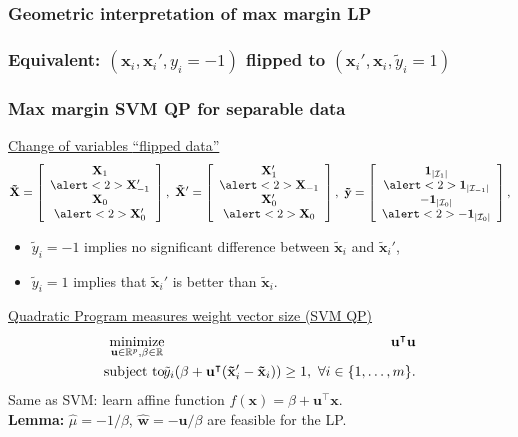\documentclass{beamer}
\DeclareMathOperator*{\minimize}{minimize}
\newcommand{\RR}{\mathbb R}
\begin{document}
\begin{frame}
  \frametitle{Geometric interpretation of max margin LP}
  
\end{frame}

\begin{frame}
  \frametitle{Equivalent: $(\mathbf x_i, \mathbf x_i', y_i=-1)$ flipped to $(\mathbf x_i', \mathbf x_i, \tilde y_i=1)$}
  
\end{frame}

\begin{frame}
  \frametitle{Max margin SVM QP for separable data}
  \underline{Change of variables \alert<2>{``flipped data''}}
  \begin{equation*}
\label{eq:tilde}
\mathbf{  \tilde X} = \left[
    \begin{array}{c}
      \mathbf X_1 \\
      \alert<2>{\mathbf X_{-1}'}\\
      \mathbf X_0\\
      \alert<2>{\mathbf X_0'}
    \end{array}
  \right],\ 
  \mathbf{\tilde X'} = \left[
    \begin{array}{c}
      \mathbf X_1' \\
      \alert<2>{\mathbf X_{-1}}\\
      \mathbf X_0'\\
      \alert<2>{\mathbf X_0}
    \end{array}
  \right],\ 
  \mathbf{\tilde y} = \left[
    \begin{array}{c}
      \mathbf 1_{|\mathcal I_1|} \\
      \alert<2>{\mathbf 1_{|\mathcal I_{-1}|}}\\
      \mathbf{-1}_{|\mathcal I_0|}\\
      \alert<2>{\mathbf{-1}_{|\mathcal I_0|}}
    \end{array}
  \right],
\end{equation*}
\vskip -0.5cm
\begin{itemize}
\item  $\tilde y_i=-1$ implies no significant
difference between $\mathbf{\tilde x}_i$ and $\mathbf{\tilde x}_i'$,
\item  $\tilde y_i=1$ implies that $\mathbf{\tilde x}_i'$ is better than
$\mathbf{\tilde x}_i$.
\end{itemize}
  \underline{Quadratic Program measures weight vector size (SVM QP)}
\begin{eqnarray*}
  \label{eq:max-margin-qp-tilde}
  \minimize_{\mathbf u\in\RR^p, \beta\in\RR}\ &&\hskip -0.5cm
  \mathbf u^\intercal \mathbf u  \\
\nonumber    \text{subject to}\ &&\hskip -0.5cm 
    \tilde y_i (\beta + 
    \mathbf u^\intercal( \mathbf{\tilde x}_i'-\mathbf{\tilde x}_i) ) \geq 1,
    \ \forall i\in\{1,\dots,m\}.
\end{eqnarray*}
Same as SVM: learn affine function $f(\mathbf x)=\beta+\mathbf
u^\intercal \mathbf x$.\\
\textbf{Lemma:} $\hat{\mu} = -1/\beta$,
$\hat{ \mathbf{w}} = -\mathbf{u}/\beta$ are feasible for the LP.
\end{frame}
\end{document}
